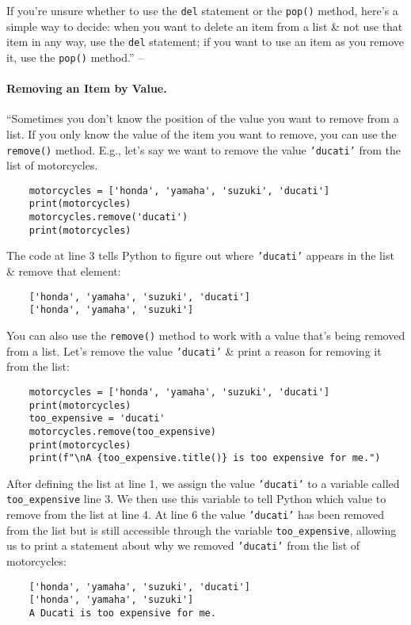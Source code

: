 \documentclass[oneside]{book}
\numberwithin{equation}{section}
\begin{document}
If you're unsure whether to use the \texttt{del} statement or the \texttt{pop()} method, here's a simple way to decide: when you want to delete an item from a list \& not use that item in any way, use the \texttt{del} statement; if you want to use an item as you remove it, use the \texttt{pop()} method.'' -- \cite[pp. 40--41]{Matthes2019}

\paragraph{Removing an Item by Value.} ``Sometimes you don't know the position of the value you want to remove from a list. If you only know the value of the item you want to remove, you can use the \texttt{remove()} method. E.g., let's say we want to remove the value \texttt{'ducati'} from the list of motorcycles.
\begin{verbatim}
	motorcycles = ['honda', 'yamaha', 'suzuki', 'ducati']
	print(motorcycles)
	motorcycles.remove('ducati')
	print(motorcycles)
\end{verbatim}
The code at line 3 tells Python to figure out where \texttt{'ducati'} appears in the list \& remove that element:
\begin{verbatim}
	['honda', 'yamaha', 'suzuki', 'ducati']
	['honda', 'yamaha', 'suzuki']
\end{verbatim}
You can also use the \texttt{remove()} method to work with a value that's being removed from a list. Let's remove the value \texttt{'ducati'} \& print a reason for removing it from the list:
\begin{verbatim}
	motorcycles = ['honda', 'yamaha', 'suzuki', 'ducati']
	print(motorcycles)
	too_expensive = 'ducati'
	motorcycles.remove(too_expensive)
	print(motorcycles)
	print(f"\nA {too_expensive.title()} is too expensive for me.")
\end{verbatim}
After defining the list at line 1, we assign the value \texttt{'ducati'} to a variable called \verb|too_expensive| line 3. We then use this variable to tell Python which value to remove from the list at line 4. At line 6 the value \texttt{'ducati'} has been removed from the list but is still accessible through the variable \verb|too_expensive|, allowing us to print a statement about why we removed \texttt{'ducati'} from the list of motorcycles:
\begin{verbatim}
	['honda', 'yamaha', 'suzuki', 'ducati']
	['honda', 'yamaha', 'suzuki']
	A Ducati is too expensive for me.
\end{verbatim}
\end{document}
